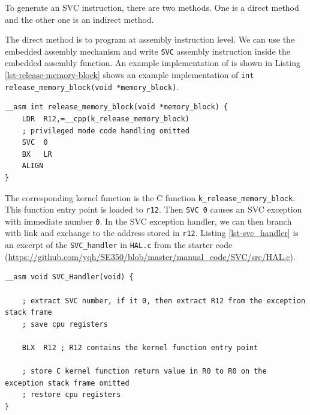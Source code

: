 To generate an SVC instruction, there are two methods. One is a direct method and the other one is an indirect method. 

The direct method is to program at assembly instruction level. We can use the embedded assembly mechanism and write \verb+SVC+ assembly instruction inside the embedded assembly function. An example implementation of
is shown in
Listing \ref{lst-release-memory-block} shows an example implementation of \verb+int release_memory_block(void *memory_block)+. 
\begin{lstlisting}[caption={Code Snippet of release\_memory\_block}, label=lst-release-memory-block]
__asm int release_memory_block(void *memory_block) {
    LDR  R12,=__cpp(k_release_memory_block)
    ; privileged mode code handling omitted 
    SVC  0
    BX   LR
    ALIGN
}
\end{lstlisting}
The corresponding kernel function is the C function \verb+k_release_memory_block+. This function entry point is loaded to \verb+r12+. Then  \verb+SVC 0+ causes an SVC exception with immediate number \verb+0+.
In the SVC exception handler, we can then branch with link and exchange to the address stored in \verb+r12+. Listing \ref{lst-svc_handler} is an excerpt of the \verb+SVC_handler+ in \verb+HAL.c+ from the starter code (\url{https://github.com/yqh/SE350/blob/master/manual_code/SVC/src/HAL.c}).

\begin{lstlisting}[caption={Code Snippet of SVC\_Handler}, label=lst-svc_handler]
  __asm void SVC_Handler(void) {
    
    ; extract SVC number, if it 0, then extract R12 from the exception stack frame
    ; save cpu registers

    BLX  R12 ; R12 contains the kernel function entry point

    ; store C kernel function return value in R0 to R0 on the exception stack frame omitted
    ; restore cpu registers
}
\end{lstlisting}

